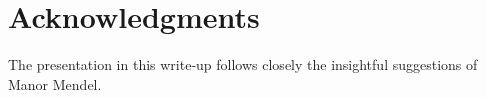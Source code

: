 \section*{Acknowledgments}

The presentation in this write-up follows closely the insightful
suggestions of Manor Mendel.

% 
%




\ChapterEnd{}



%
